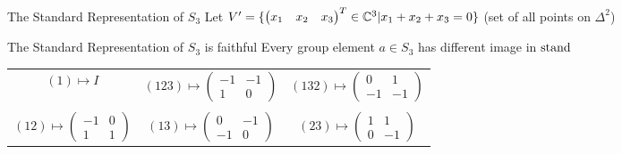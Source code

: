 \begin{frame}{The Standard Representation of $S_3$}
    \large
    Let $V' = \{\begin{pmatrix}
        x_1 & x_2 & x_3
    \end{pmatrix}^T \in \mathbb{C}^3 | x_1 + x_2 + x_3 = 0\}$
    (set of all points on $\Delta^2$)
    

    
    \vspace{1em}
    
\end{frame}

\begin{frame}{The Standard Representation of $S_3$ is faithful}
    Every group element $a \in S_3$ has different image in $\operatorname{stand}$

    \pause
    \vspace{1em}
    \centering
    \begin{tabular}{c c c}
        $(1) \mapsto I$ & \pause $(123) \mapsto \begin{pmatrix}
            -1 & -1 \\
            1 & 0
        \end{pmatrix}$ & \pause $(132) \mapsto \begin{pmatrix}
            0 & 1 \\
            -1 & -1
        \end{pmatrix}$ \\\\ \pause $(12) \mapsto \begin{pmatrix}
            -1 & 0 \\
            1 & 1
        \end{pmatrix}$ & \pause $(13) \mapsto \begin{pmatrix}
            0 & -1 \\
            -1 & 0
        \end{pmatrix}$ & \pause $(23) \mapsto \begin{pmatrix}
            1 & 1 \\
            0 & -1
        \end{pmatrix}$
    \end{tabular}
\end{frame}

